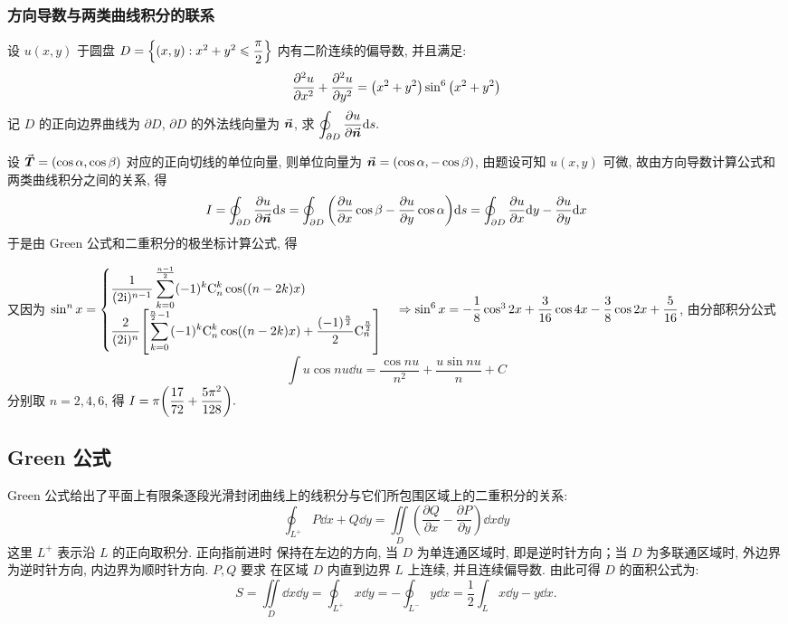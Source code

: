 \subsubsection{方向导数与两类曲线积分的联系}

\begin{example}
    设 $u(x,y)$ 于圆盘 $D=\qty{(x,y):x^2+y^2\leqslant \dfrac{\pi}{2}}$ 内有二阶连续的偏导数, 并且满足:
    $$\pdv[2]{u}{x}+\pdv[2]{u}{y}=\qty(x^2+y^2)\sin^6\qty(x^2+y^2)$$
    记 $D$ 的正向边界曲线为 $\partial D$, $\partial D$ 的外法线向量为 $\va*{n}$, 求 $\displaystyle \oint_{\partial D}\pdv{u}{\va*{n}}\dd s.$
\end{example}
\begin{solution}
    设 $\va*{T}=(\cos\alpha,\cos\beta)$ 对应的正向切线的单位向量, 则单位向量为 $\va*{n}=(\cos\alpha,-\cos\beta)$, 由题设可知 $u(x,y)$ 可微, 
    故由方向导数计算公式和两类曲线积分之间的关系, 得
    $$I=\oint_{\partial D}\pdv{u}{\va*{n}}\dd s=\oint_{\partial D}\qty(\pdv{u}{x}\cos \beta-\pdv{u}{y}\cos \alpha)\dd s=\oint_{\partial D}\pdv{u}{x}\dd y-\pdv{u}{y}\dd x$$
    于是由 Green 公式和二重积分的极坐标计算公式, 得
    又因为 $\sin^nx=\begin{cases}
            \displaystyle \dfrac{1}{(2\mathrm{i})^{n-1}}\sum_{k=0}^{\frac{n-1}{2}}(-1)^k\mathrm{C}_n^k\cos((n-2k)x) \\
            \displaystyle \dfrac{2}{(2\mathrm{i})^n}\qty[\sum_{k=0}^{\frac{n}{2}-1}(-1)^k\mathrm{C}_n^k\cos((n-2k)x)+\dfrac{(-1)^{\frac{n}{2}}}{2}\mathrm{C}_n^{\frac{n}{2}}]
        \end{cases}\Rightarrow \sin^6x=-\dfrac{1}{8}\cos^32x+\dfrac{3}{16}\cos 4x-\dfrac{3}{8}\cos 2x+\dfrac{5}{16}$, 由分部积分公式
    $$\int u\cos nu\dd u=\dfrac{\cos nu}{n^2}+\dfrac{u\sin nu}{n}+C$$
    分别取 $n=2,4,6$, 得 $\displaystyle I=\pi\qty(\dfrac{17}{72}+\dfrac{5\pi^2}{128}).$
\end{solution}

\subsection{Green 公式}

\begin{theorem}[Green 公式]
    Green 公式给出了平面上有限条逐段光滑封闭曲线上的线积分与它们所包围区域上的二重积分的关系:
    $$\oint_{L^+}P\dd x+Q\dd y=\iint\limits_D\left(\frac{\partial Q}{\partial x}-\frac{\partial P}{\partial y}\right)\dd x\dd y$$
    这里 $L^+$ 表示沿 $L$ 的正向取积分. 正向指前进时  保持在左边的方向, 当 $D$ 为单连通区域时, 
    即是逆时针方向；当 $D$ 为多联通区域时, 外边界为逆时针方向, 内边界为顺时针方向. $P,Q$ 要求
    在区域 $D$ 内直到边界 $L$ 上连续, 并且连续偏导数. 由此可得 $D$ 的面积公式为:
    $$S=\iint\limits_D\dd x\dd y=\oint_{L^+}x\dd y=-\oint_{L^-}y\dd x=\frac{1}{2}\int_Lx\dd y-y\dd x.$$
\end{theorem}

